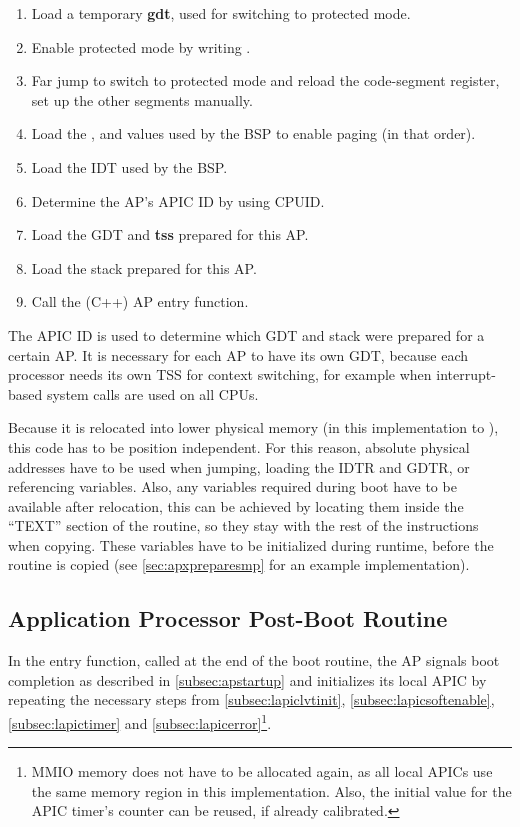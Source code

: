 \begin{enumerate}
  \item Load a temporary \textbf{\gls{gdt}}, used for switching to protected mode.
  \item Enable protected mode by writing .
  \item Far jump to switch to protected mode and reload the code-segment register, set up the other
        segments manually.
  \item Load the ,  and  values used by the BSP to enable paging (in that
        order).
  \item Load the IDT used by the BSP\@.
  \item Determine the AP's APIC ID by using CPUID\@.
  \item Load the GDT and \textbf{\gls{tss}} prepared for this AP\@.
  \item Load the stack prepared for this AP\@.
  \item Call the (C++) AP entry function.
\end{enumerate}

The APIC ID is used to determine which GDT and stack were prepared for a certain AP\@. It is
necessary for each AP to have its own GDT, because each processor needs its own TSS for context
switching, for example when interrupt-based system calls are used on all CPUs.

Because it is relocated into lower physical memory (in this implementation to ), this
code has to be position independent. For this reason, absolute physical addresses have to be used
when jumping, loading the IDTR and GDTR, or referencing variables. Also, any variables required
during boot have to be available after relocation, this can be achieved by locating them inside the
``TEXT'' section of the routine, so they stay with the rest of the instructions when copying. These
variables have to be initialized during runtime, before the routine is copied (see
\autoref{sec:apxpreparesmp} for an example implementation).

\subsection{Application Processor Post-Boot Routine}
\label{subsec:apsystementry}

In the entry function, called at the end of the boot routine, the AP signals boot completion as
described in \autoref{subsec:apstartup} and initializes its local APIC by repeating the necessary
steps from \autoref{subsec:lapiclvtinit}, \autoref{subsec:lapicsoftenable},
\autoref{subsec:lapictimer} and \autoref{subsec:lapicerror}\footnote{MMIO memory does not have to
  be allocated again, as all local APICs use the same memory region in this implementation. Also, the
  initial value for the APIC timer's counter can be reused, if already calibrated.}.

